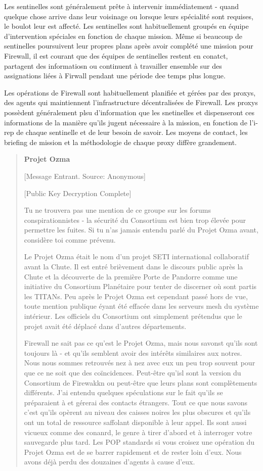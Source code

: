 Les sentinelles sont généralement prête à intervenir immédiatement - quand quelque chose arrive dans leur voisinage ou lorsque leurs spécialité sont requises, le boulot leur est affecté. Les sentinelles sont habituellement groupés en équipe d'intervention spéciales en fonction de chaque mission. Même si beaucoup de sentinelles poursuivent leur propres plans après avoir complété une mission pour Firewall, il est courant que des équipes de sentinelles restent en conatct, partagent des informatiosn ou continuent à travailler ensemble sur des assignations liées à Firwall pendant une période dee temps plus longue. 

Les opérations de Firewall sont habituellement planifiée et gérées par des proxys, des agents qui maintiennent l'infrastructure décentralisées de Firewall. Les proxys possèdent généralement plsu d'information que les snetinelles et dispenseront ces informations de la manière qu'ils jugent nécessaire à la mission, en fonction de l'i-rep de chaque sentinelle et de leur besoin de savoir. Les moyens de contact, les briefing de mission et la méthodologie de chaque proxy diffère grandement. 

\begin{quotation} \textbf{Projet Ozma} 

[Message Entrant. Source: Anonymous] 

[Public Key Decryption Complete] 

Tu ne trouvera pas une mention de ce groupe sur les forums conspirationnistes - la sécurité du Consortium est bien trop élevée pour permettre les fuites. Si tu n'as jamais entendu parlé du Projet Ozma avant, considère toi comme prévenu. 

Le Projet Ozma était le nom d'un projet SETI international collaboratif avant la Chute. Il est entré brièvement dans le discours public après la Chute et la découverte de la première Porte de Pandorre  comme une initiative du Consortium Planétaire pour tenter de discerner où sont partis les TITANs. Peu après le Projet Ozma est cependant passé hors de vue, toute mention publique éyant été effacée dans les serveurs mesh du système intérieur. Les officiels du Consortium ont simplement prétendus que le projet avait été déplacé dans d'autres départements. 

Firewall ne sait pas ce qu'est le Projet Ozma, mais nous savonst qu'ils sont toujours là - et qu'ils semblent avoir des intérêts similaires aux notres. Nous nous sommes retrouvés nez à nez avec eux un peu trop souvent pour que ce ne soit que des coïncidences. Peut-être qu'isl sont la version du Consortium de Firewakkn ou peut-être que leurs plans sont complètements différents. J'ai entendu quelques spéculations sur le fait qu'ils se préparaient à et gérerai des contacts étrangers. Tout ce que nous savons c'est qu'ils opèrent au niveau des caisses noires les plus obscures et qu'ils ont un total de ressource saffolant disponible à leur appel. Ils sont aussi vicueux comme des conanrd, le genre à tirer d'abord et à interroger votre sauvegarde plus tard. Les POP standards si vous croisez une opération du Projet Ozma est de se barrer rapidement et de rester loin d'eux. Nous avons déjà perdu des douzaines d'agents à cause d'eux. \end{quotation} 

